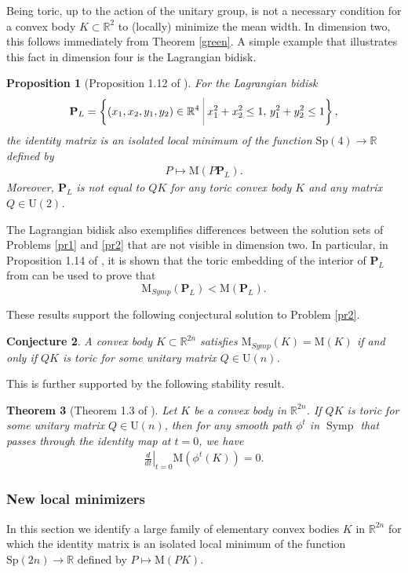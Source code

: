 \documentclass[12pt]{amsart}
\newtheorem{theorem}{Theorem}[section]
\newtheorem{proposition}[theorem]{Proposition}
\newtheorem{conjecture}[theorem]{Conjecture}
\theoremstyle{definition}
\newcommand\Symp{\operatorname{Symp}}
\def\bigmid{\ \rule[-3.5mm]{0.1mm}{9mm}\ }
\newcommand{\RR}{{\mathbb R}}
\newcommand{\mw}{{{\mathrm {M}}}}
\newcommand{\nlmw}{\mathrm{M}_{{Symp}}}
\begin{document}
Being toric, up to the action of the unitary group, is not a necessary condition for a convex body $K \subset \RR^{2}$ to (locally) minimize the mean width. In dimension two, this follows immediately from Theorem \ref{green}. A simple example that illustrates this fact in dimension four is the Lagrangian bidisk.

\begin{proposition}[Proposition 1.12 of \cite{ak}]
For the Lagrangian bidisk
$$\mathbf{P}_L = \left\{ (x_1, x_{2}, y_1, y_{2}) \in \mathbb{R}^{4} \bigmid  x_1^2 +x_2^2 \leq 1,\, y_1^2 +y_2^2 \leq 1\right\},$$ the identity matrix is an isolated  local minimum of the function  $\mathrm{Sp}(4) \to \RR$ defined by
\begin{align*}
 P \mapsto \mw(P \mathbf{P}_L).
\end{align*} 
Moreover, $\mathbf{P}_L$ is not equal to $QK$ for any toric convex body $K$ and any matrix $Q \in \mathrm{U}(2)$.
\end{proposition}

The Lagrangian bidisk also exemplifies differences between the solution sets of Problems \ref{pr1} and \ref{pr2} that are not visible in dimension two. In particular, in Proposition 1.14 of \cite{ak}, it is shown that the toric embedding of the interior of $\mathbf{P}_L$ from \cite{vr} can be used to prove that $$\nlmw(\mathbf{P}_L) < \mw(\mathbf{P}_L).$$

These results support the following conjectural solution to Problem \ref{pr2}.

\begin{conjecture}\label{conj}
 A convex body $K \subset \RR^{2n}$ satisfies 
 $\nlmw(K) =\mw (K)$
if and only if $QK$ is toric for some unitary matrix $Q \in \mathrm{U}(n)$.
\end{conjecture}

This is further supported by the following stability result. 


\begin{theorem}[Theorem 1.3 of \cite{ak}]\label{variation}
Let $K$ be a convex body in $\RR^{2n}$. If  $QK$ is toric for some unitary matrix $Q \in \mathrm{U}(n)$, then for any smooth path $\phi^t$ in $\Symp$ that passes through the identity map at $t=0$, we have
\begin{align*}
    \left.\frac{d}{dt}\right|_{t=0} \mw(\phi^t(K)) = 0.
\end{align*}
\end{theorem}


\subsubsection{New local minimizers} In this section we identify a large family of elementary convex bodies $K$ in $\RR^{2n}$ for which the identity matrix is an isolated  local minimum of the function  $\mathrm{Sp}(2n) \to \RR$ defined by
$
 P \mapsto \mw(P K).$
\end{document}
